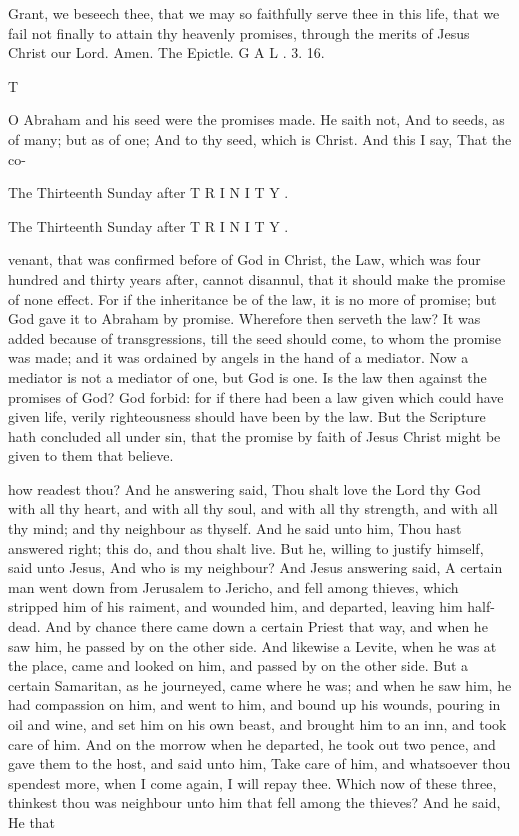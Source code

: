 Grant, we beseech thee, that we may so faithfully serve thee in this life, that we fail not finally to attain thy heavenly promises, through the merits of Jesus Christ our Lord. Amen. The Epictle. G A L . 3. 16.

T

O Abraham and his seed were the promises made. He saith not, And to seeds, as of many; but as of one; And to thy seed, which is Christ. And this I say, That the co-

The Thirteenth Sunday after T R I N I T Y .

The Thirteenth Sunday after T R I N I T Y .

venant, that was confirmed before of God in Christ, the Law, which was four hundred and thirty years after, cannot disannul, that it should make the promise of none effect. For if the inheritance be of the law, it is no more of promise; but God gave it to Abraham by promise. Wherefore then serveth the law? It was added because of transgressions, till the seed should come, to whom the promise was made; and it was ordained by angels in the hand of a mediator. Now a mediator is not a mediator of one, but God is one. Is the law then against the promises of God? God forbid: for if there had been a law given which could have given life, verily righteousness should have been by the law. But the Scripture hath concluded all under sin, that the promise by faith of Jesus Christ might be given to them that believe.

how readest thou? And he answering said, Thou shalt love the Lord thy God with all thy heart, and with all thy soul, and with all thy strength, and with all thy mind; and thy neighbour as thyself. And he said unto him, Thou hast answered right; this do, and thou shalt live. But he, willing to justify himself, said unto Jesus, And who is my neighbour? And Jesus answering said, A certain man went down from Jerusalem to Jericho, and fell among thieves, which stripped him of his raiment, and wounded him, and departed, leaving him half-dead. And by chance there came down a certain Priest that way, and when he saw him, he passed by on the other side. And likewise a Levite, when he was at the place, came and looked on him, and passed by on the other side. But a certain Samaritan, as he journeyed, came where he was; and when he saw him, he had compassion on him, and went to him, and bound up his wounds, pouring in oil and wine, and set him on his own beast, and brought him to an inn, and took care of him. And on the morrow when he departed, he took out two pence, and gave them to the host, and said unto him, Take care of him, and whatsoever thou spendest more, when I come again, I will repay thee. Which now of these three, thinkest thou was neighbour unto him that fell among the thieves? And he said, He that

